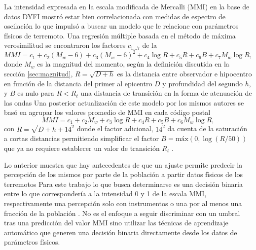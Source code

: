 \documentclass[a4paper]{report}
\begin{document}
La intensidad expresada en la escala modificada de Mercalli (MMI) \cite{noauthor_intensidad_2022} en la base de datos DYFI mostró estar bien correlacionada con medidas de espectro de oscilación lo que impulsó a buscar un modelo que le relacione con parámetros físicos de terremoto.
Una regresión múltiple basada en el método de máxima verosimilitud se encontraron los factores \(c_{1\dots7}\) de la \cite[ecuación 1]{atkinson_did_2007}
\begin{equation}
	MMI = c_1 + c_2 (M_w - 6) + c_3 (M_w - 6)^2 + c_4\log{R} + c_5 R + c_6 B + c_7 M_w \log{R}, 
	\label{eq:atkinson2007}
\end{equation}
donde \(M_w\) es la magnitud del momento, según la definición discutida en la sección \ref{sec:magnitud}, \(R = \sqrt{D + h}\) es la distancia entre observador e hipocentro en función de la distancia del primer al epicentro \(D\) y profundidad del segundo \(h\), y \(B\) es nulo para \(R < R_t\) una distancia de transición en la forma de atenuación de las ondas 
Una posterior actualización de este modelo por los mismos autores se basó en agrupar los valores promedio de MMI en cada código postal
\begin{equation}
	MMI = c_1 + c_2 M_w + c_3 \log{R} + c_4 R + c_5 B + c_6 M_w\log{R},
	\label{eq:atkinson2014}
\end{equation}
con \(R = \sqrt{D + h + 14^2 }\) donde el factor adicional, \(14^2\) da cuenta de la saturación a cortas distancias permitiendo simplificar el factor \(B = \text{máx}(0, \log(R/50))\) que ya no requiere establecer un valor de transición \(R_t\) \cite{atkinson_intensity_2014}. 
	
Lo anterior muestra que hay antecedentes de que un ajuste permite predecir la percepción de los mismos por parte de la población a partir datos físicos de los terremotos 
Para este trabajo lo que busca determinarse es una decisión binaria entre lo que correspondería a la intensidad 0 y 1 de la escala MMI, respectivamente una percepción solo con instrumentos o una por al menos una fracción de la población \cite{noauthor_intensidad_2022}.
No es el enfoque a seguir discriminar con un umbral tras una predicción del valor MMI sino utilizar las técnicas de aprendizaje automático que generen una decisión binaria directamente desde los datos de parámetros físicos.

\end{document}
